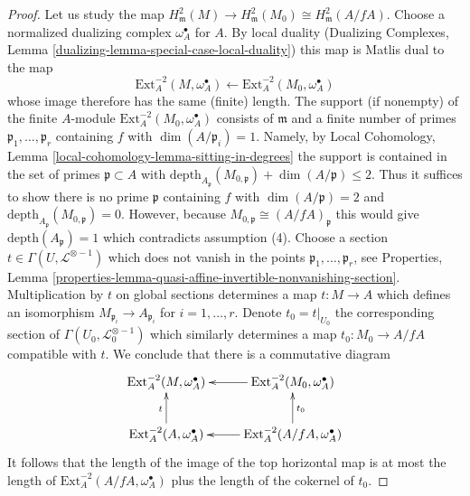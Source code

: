 \documentclass{stacks-project}
\theoremstyle{plain}
\theoremstyle{definition}
\theoremstyle{remark}
\numberwithin{equation}{subsection}
\begin{document}
\begin{proof}
\medskip\noindent
Let us study the map
$H^2_\mathfrak m(M) \to H^2_\mathfrak m(M_0) \cong H^2_\mathfrak m(A/fA)$.
Choose a normalized dualizing complex $\omega_A^\bullet$ for $A$.
By local duality
(Dualizing Complexes, Lemma \ref{dualizing-lemma-special-case-local-duality})
this map is Matlis dual to the map
$$
\text{Ext}^{-2}_A(M, \omega_A^\bullet)
\longleftarrow
\text{Ext}^{-2}_A(M_0, \omega_A^\bullet)
$$
whose image therefore has the same (finite) length.
The support (if nonempty) of the finite $A$-module
$\text{Ext}^{-2}_A(M_0, \omega_A^\bullet)$ consists of
$\mathfrak m$ and a finite number of primes
$\mathfrak p_1, \ldots, \mathfrak p_r$ containing $f$ with
$\dim(A/\mathfrak p_i) = 1$. Namely, by
Local Cohomology, Lemma \ref{local-cohomology-lemma-sitting-in-degrees}
the support is contained in the set of primes $\mathfrak p \subset A$ with
$\text{depth}_{A_\mathfrak p}(M_{0, \mathfrak p}) + \dim(A/\mathfrak p) \leq 2$.
Thus it suffices to show there is no prime $\mathfrak p$ containing $f$ with
$\dim(A/\mathfrak p) = 2$ and
$\text{depth}_{A_\mathfrak p}(M_{0, \mathfrak p}) = 0$.
However, because $M_{0, \mathfrak p} \cong (A/fA)_\mathfrak p$
this would give $\text{depth}(A_\mathfrak p) = 1$ which contradicts
assumption (4).
Choose a section $t \in \Gamma(U, \mathcal{L}^{\otimes -1})$
which does not vanish in the points $\mathfrak p_1, \ldots, \mathfrak p_r$, see
Properties, Lemma
\ref{properties-lemma-quasi-affine-invertible-nonvanishing-section}.
Multiplication by $t$ on global sections determines a map $t : M \to A$
which defines an isomorphism $M_{\mathfrak p_i} \to A_{\mathfrak p_i}$ for
$i = 1, \ldots, r$. Denote $t_0 = t|_{U_0}$ the corresponding section
of $\Gamma(U_0, \mathcal{L}_0^{\otimes -1})$ which similarly determines
a map $t_0 : M_0 \to A/fA$ compatible with $t$.
We conclude that there is a commutative diagram
$$
\xymatrix{
\text{Ext}^{-2}_A(M, \omega_A^\bullet) &
\text{Ext}^{-2}_A(M_0, \omega_A^\bullet) \ar[l] \\
\text{Ext}^{-2}_A(A, \omega_A^\bullet) \ar[u]^t &
\text{Ext}^{-2}_A(A/fA, \omega_A^\bullet) \ar[l] \ar[u]_{t_0}
}
$$
It follows that the length of the image of the top horizontal
map is at most the length of $\text{Ext}^{-2}_A(A/fA, \omega_A^\bullet)$
plus the length of the cokernel of $t_0$.


\end{proof}
\end{document}
